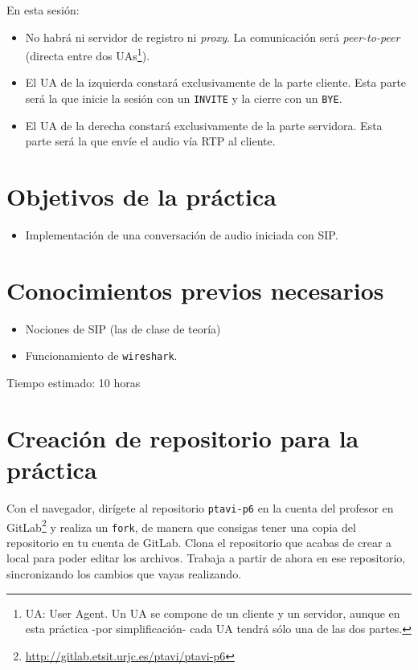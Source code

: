 \documentclass[a4paper,11pt]{article}
\begin{document}
En esta sesión:

\begin{itemize}
  \item No habrá ni servidor de registro ni \emph{proxy}. La comunicación será \emph{peer-to-peer} (directa entre dos UAs\footnote{UA: User Agent. Un UA se compone de un cliente y un servidor, aunque en esta práctica -por simplificación- cada UA tendrá sólo una de las dos partes.}).
  \item El UA de la izquierda constará exclusivamente de la parte cliente. Esta parte será la que inicie la sesión con un \texttt{INVITE} y la cierre con un \texttt{BYE}.
  \item El UA de la derecha constará exclusivamente de la parte servidora. Esta parte será la que envíe el audio vía RTP al cliente.
\end{itemize}


\section*{Objetivos de la práctica}

\begin{itemize}
  \item Implementación de una conversación de audio iniciada con SIP.
\end{itemize}

\section*{Conocimientos previos necesarios}

\begin{itemize}
  \item Nociones de SIP (las de clase de teoría)
  \item Funcionamiento de \texttt{wireshark}.
\end{itemize}

Tiempo estimado: 10 horas

\section*{Creación de repositorio para la práctica}

Con el navegador, dirígete al repositorio \texttt{ptavi-p6} en la cuenta del profesor en GitLab\footnote{\url{http://gitlab.etsit.urjc.es/ptavi/ptavi-p6}} y realiza un \texttt{fork}, de manera que consigas tener una copia del repositorio en tu cuenta de GitLab. Clona el repositorio que acabas de crear a local para poder editar los archivos. Trabaja a partir de ahora en ese repositorio, sincronizando los cambios que vayas realizando.
\end{document}
